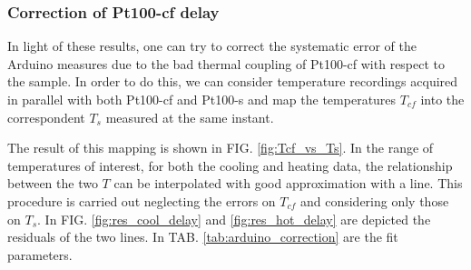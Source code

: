 \documentclass[rmp,10pt,onecolumn,fleqn,notitlepage]{revtex4-1}
\begin{document}
\clearpage

\subsubsection{Correction of Pt100-cf delay}
\label{subsubsec:correction_arduino}

In light of these results, one can try to correct the systematic error of the Arduino measures due to the bad thermal coupling of Pt100-cf with respect to the sample. In order to do this, we can consider temperature recordings acquired in parallel with both Pt100-cf and Pt100-s and map the temperatures $T_{cf}$ into the correspondent $T_s$ measured at the same instant. 

The result of this mapping is shown in FIG. \ref{fig:Tcf_vs_Ts}. In the range of temperatures of interest, for both the cooling and heating data, the relationship between the two $T$ can be interpolated with good approximation with a line. This procedure is carried out neglecting the errors on $T_{cf}$ and considering only those on $T_{s}$. In FIG. \ref{fig:res_cool_delay} and \ref{fig:res_hot_delay} are depicted the residuals of the two lines. In TAB. \ref{tab:arduino_correction} are the fit parameters.
\end{document}
